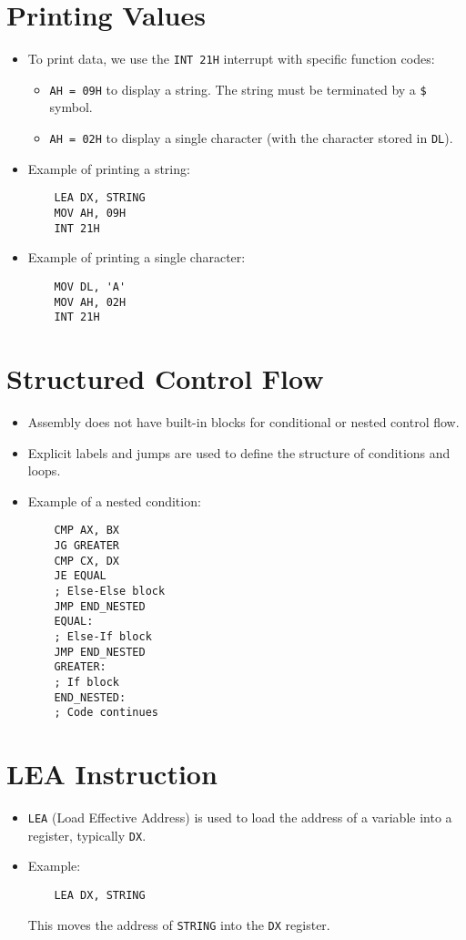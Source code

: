 \documentclass[a4paper,12pt]{article}
\begin{document}
\section{Printing Values}
\begin{itemize}
    \item To print data, we use the \texttt{INT 21H} interrupt with specific function codes:
    \begin{itemize}
        \item \texttt{AH = 09H} to display a string. The string must be terminated by a \texttt{\$} symbol.
        \item \texttt{AH = 02H} to display a single character (with the character stored in \texttt{DL}).
    \end{itemize}
    \item Example of printing a string:
    \begin{verbatim}
    LEA DX, STRING
    MOV AH, 09H
    INT 21H
    \end{verbatim}
    \item Example of printing a single character:
    \begin{verbatim}
    MOV DL, 'A'
    MOV AH, 02H
    INT 21H
    \end{verbatim}
\end{itemize}

\section{Structured Control Flow}
\begin{itemize}
    \item Assembly does not have built-in blocks for conditional or nested control flow.
    \item Explicit labels and jumps are used to define the structure of conditions and loops.
    \item Example of a nested condition:
    \begin{verbatim}
    CMP AX, BX
    JG GREATER
    CMP CX, DX
    JE EQUAL
    ; Else-Else block
    JMP END_NESTED
    EQUAL:
    ; Else-If block
    JMP END_NESTED
    GREATER:
    ; If block
    END_NESTED:
    ; Code continues
    \end{verbatim}
\end{itemize}

\section{LEA Instruction}
\begin{itemize}
    \item \texttt{LEA} (Load Effective Address) is used to load the address of a variable into a register, typically \texttt{DX}.
    \item Example:
    \begin{verbatim}
    LEA DX, STRING
    \end{verbatim}
    This moves the address of \texttt{STRING} into the \texttt{DX} register.
\end{itemize}
\end{document}
